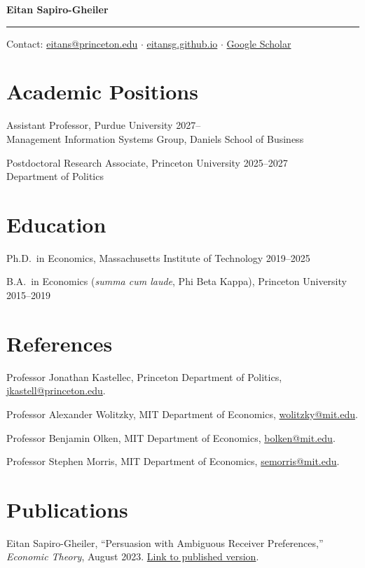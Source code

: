 \documentclass[11pt,reqno]{amsart}
\begin{document}

\Large
\textbf{Eitan Sapiro-Gheiler}
\vspace{0.25cm}
\hrule
\vspace{0.3cm}

\normalsize

Contact: \href{mailto:eitans@princeton.edu}{eitans@princeton.edu} \quad $\cdot$ \quad \href{https://eitansg.github.io}{eitansg.github.io} \quad $\cdot$ \quad \href{https://scholar.google.com/citations?user=eIXUMmwAAAAJ&hl=en}{Google Scholar}

\section*{Academic Positions}
Assistant Professor, Purdue University \hfill 2027--\\
Management Information Systems Group, Daniels School of Business

Postdoctoral Research Associate, Princeton University \hfill 2025--2027\\
Department of Politics

\section*{Education}
Ph.D.\ in Economics, Massachusetts Institute of Technology \hfill 2019--2025

B.A.\ in Economics (\textit{summa cum laude}, Phi Beta Kappa), Princeton University \hfill 2015--2019

\section*{References}
Professor Jonathan Kastellec, Princeton Department of Politics, \href{mailto:jkastell@princeton.edu}{jkastell@princeton.edu}.

Professor Alexander Wolitzky, MIT Department of Economics, \href{mailto:wolitzky@mit.edu}{wolitzky@mit.edu}.

Professor Benjamin Olken, MIT Department of Economics, \href{mailto:bolken@mit.edu}{bolken@mit.edu}.

Professor Stephen Morris, MIT Department of Economics, \href{mailto:semorris@mit.edu}{semorris@mit.edu}.

\section*{Publications}
Eitan Sapiro-Gheiler, ``Persuasion with Ambiguous Receiver Preferences,'' \textit{Economic Theory}, August 2023. \href{https://doi.org/10.1007/s00199-023-01522-z}{Link to published version}.
\end{document}
